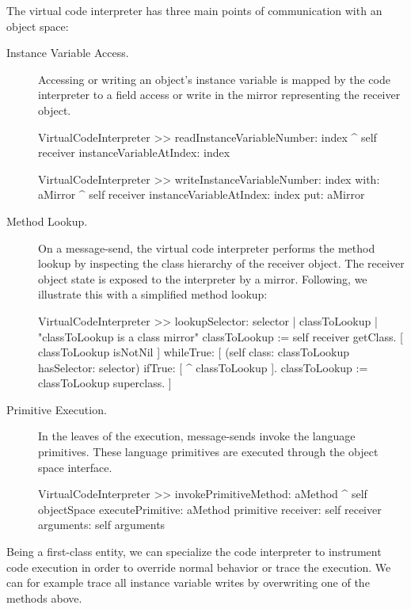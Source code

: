 The virtual code interpreter has three main points of communication with an object space:

\begin{description}
\item[Instance Variable Access.] Accessing or writing an object's instance variable is mapped by the code interpreter to a field access or write in the mirror representing the receiver object.

\begin{code}
VirtualCodeInterpreter >> readInstanceVariableNumber: index
    ^ self receiver instanceVariableAtIndex: index
    
VirtualCodeInterpreter >> writeInstanceVariableNumber: index with: aMirror
    ^ self receiver instanceVariableAtIndex: index put: aMirror
\end{code}

\item[Method Lookup.] On a message-send, the virtual code interpreter performs the method lookup by inspecting the class hierarchy of the receiver object. The receiver object state is exposed to the interpreter by a mirror. Following, we illustrate this with a simplified method lookup:

\begin{code}
VirtualCodeInterpreter >> lookupSelector: selector
    | classToLookup |
    "classToLookup is a class mirror"
    classToLookup := self receiver getClass.
    [ classToLookup isNotNil ] whileTrue: [
        (self class: classToLookup hasSelector: selector)
        	    ifTrue: [ ^ classToLookup ].
	classToLookup := classToLookup superclass.
    ]
\end{code}

\item[Primitive Execution.] In the leaves of the execution, message-sends invoke the language primitives. These language primitives are executed through the object space interface.

\begin{code}
VirtualCodeInterpreter >> invokePrimitiveMethod: aMethod
    ^ self objectSpace
         executePrimitive: aMethod primitive
         receiver: self receiver
         arguments: self arguments
\end{code}

\end{description}

Being a first-class entity, we can specialize the code interpreter to instrument code execution in order to override normal behavior or trace the execution. We can for example trace all instance variable writes by overwriting one of the methods above.

